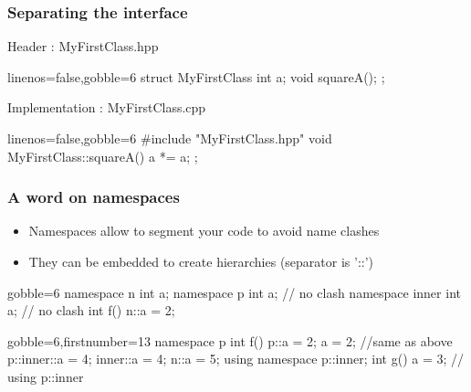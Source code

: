 \begin{frame}[fragile]
  \frametitle{Separating the interface}
  \begin{block}{Header : MyFirstClass.hpp}
    \begin{cppcode*}{linenos=false,gobble=6}
      struct MyFirstClass {
        int a;
        void squareA();
      };
    \end{cppcode*}
  \end{block}
  \begin{block}{Implementation : MyFirstClass.cpp}
    \begin{cppcode*}{linenos=false,gobble=6}
      #include "MyFirstClass.hpp"
      void MyFirstClass::squareA() {
        a *= a;
      };
    \end{cppcode*}
  \end{block}
\end{frame}

\begin{frame}[fragile]
  \frametitle{A word on namespaces}
  \begin{itemize}
  \item Namespaces allow to segment your code to avoid name clashes
  \item They can be embedded to create hierarchies (separator is '::')
  \end{itemize}
  \begin{multicols}{2}
    \begin{cppcode*}{gobble=6}
      namespace n {
        int a;
      }      
      namespace p {
        int a; // no clash
        namespace inner {
          int a; // no clash
        }
      }
      int f() {
        n::a = 2;
      }
    \end{cppcode*}
    \columnbreak
    \begin{cppcode*}{gobble=6,firstnumber=13}
      namespace p {
        int f() {
          p::a = 2;
          a = 2;  //same as above
          p::inner::a = 4;
          inner::a = 4;
          n::a = 5;
        }
      }
      using namespace p::inner;
      int g() {
        a = 3; // using p::inner
      }
  \end{cppcode*}
  \end{multicols}
\end{frame}

